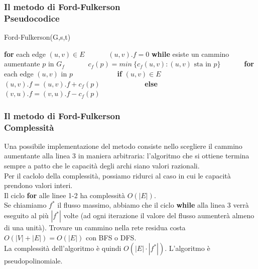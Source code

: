 \documentclass{beamer}
\begin{document}
\begin{frame}
\frametitle{Il metodo di Ford-Fulkerson\\Pseudocodice}
\begin{algorithm}[H]
    \caption{Ford-Fulkerson(G,s,t)}%
    \begin{algorithmic}[1]
        \State \textbf{for} each edge $(u,v)\in E$
        \State \ \ \ \ \ \ $(u,v).f = 0$
        \State \textbf{while} esiste un cammino aumentante $p$ in $G_f$
        \State \ \ \ \ \ \ $c_f(p)=min\ \{c_f(u,v):(u,v)\mbox{ sta in }p\}$
        \State \ \ \ \ \ \ \textbf{for} each edge $(u,v)$ in $p$
        \State \ \ \ \ \ \ \ \ \ \ \ \ \textbf{if} $(u,v)\in E$
        \State \ \ \ \ \ \ \ \ \ \ \ \ \ \ \ \ \ \ $(u,v).f = (u,v).f + c_f(p)$
        \State \ \ \ \ \ \ \ \ \ \ \ \ \textbf{else}
        \State \ \ \ \ \ \ \ \ \ \ \ \ \ \ \ \ \ \ $(v,u).f = (v,u).f - c_f(p)$
    \end{algorithmic}
    \label{alg_1}
\end{algorithm}
\end{frame}

\begin{frame}
\frametitle{Il metodo di Ford-Fulkerson\\Complessità}
Una possibile implementazione del metodo consiste nello scegliere il cammino aumentante alla linea 3 in maniera arbitraria: l'algoritmo che si ottiene termina sempre a patto che le capacità degli archi siano valori razionali.\\
Per il caclolo della complessità, possiamo ridurci al caso in cui le capacità prendono valori interi.\\
Il ciclo \textbf{for} alle linee 1-2 ha complessità $O(|E|)$.\\
Se chiamiamo $f^*$ il flusso massimo, abbiamo che il ciclo \textbf{while} alla linea 3 verrà eseguito al più $|f^*|$ volte (ad ogni iterazione il valore del flusso aumenterà almeno di una unità). Trovare un cammino nella rete residua costa $O(|V|+|E|)=O(|E|)$ con BFS o DFS.\\
La complessità dell'algoritmo è quindi $O(|E|\cdot|f^*|)$. L'algoritmo è pseudopolinomiale.
\end{frame}
\end{document}
